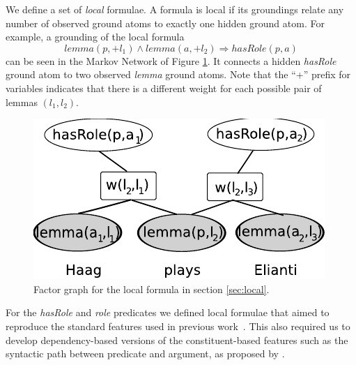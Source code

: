 


We define a set of \emph{local} formulae. A formula is local if its groundings relate any number of observed ground atoms to exactly one hidden ground atom. For example, a grounding of the local formula 
\[lemma(p,+l_1) \wedge lemma(a,+l_2) \Rightarrow hasRole(p,a)\]
can be seen in the Markov Network of Figure \ref{fig:local2}. It connects a hidden \emph{hasRole} ground atom to two observed \emph{lemma} ground atoms. Note that the ``+'' prefix for variables indicates that there is a different weight for each possible pair of lemmas $(l_1,l_2)$.


\begin{figure}
\begin{center}
    \includegraphics[scale=.70]{LocalFormula2}
\end{center}
\caption{Factor graph for the local formula in section \ref{sec:local}.}
\label{fig:local2}
\end{figure}

For the \emph{hasRole} and \emph{role} predicates we defined local formulae that aimed to reproduce the standard features used in previous work~\citep{xue04calibrating}. This also required us to develop dependency-based versions of the constituent-based features such as the syntactic path between predicate and argument, as proposed by \cite{xue04calibrating}. 

